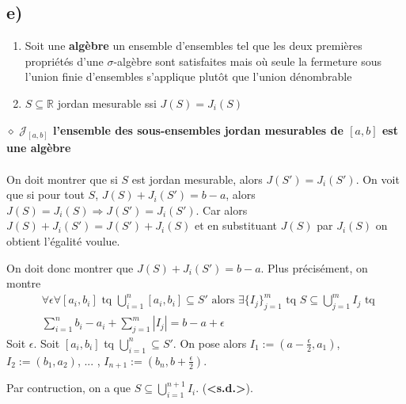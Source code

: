 \documentclass[a4paper,10pt]{article}
\begin{document}
\subsection*{e)}
\begin{enumerate}
	\item Soit une \textbf{algèbre} un ensemble d'ensembles tel que les deux premières propriétés d'une $\sigma$-algèbre sont satisfaites mais où seule la fermeture sous l'union finie d'ensembles s'applique plutôt que l'union dénombrable
	\item $S \subseteq \mathbb{R}$ jordan mesurable ssi $J(S) = J_i (S)$
\end{enumerate}
$\diamond$ \textbf{$\mathcal{J}_{[a,b]}$ l'ensemble des sous-ensembles jordan mesurables de $[a,b]$ est une algèbre}
\\
\\
On doit montrer que si $S$ est jordan mesurable, alors $J(S') = J_i (S')$. On voit que si pour tout $S$, $J(S) + J_i (S') = b-a$, alors $J(S) = J_i (S) \Rightarrow J(S') = J_i (S')$. Car alors $J(S) + J_i (S') = J(S') + J_i (S)$ et en substituant $J(S)$ par $J_i (S)$ on obtient l'égalité voulue.

On doit donc montrer que $J(S) + J_i (S') = b-a$. Plus précisément, on montre
\begin{align*}
	& \forall \epsilon \forall [a_i, b_i] \text{ tq } \bigcup_{i=1}^n [a_i, b_i] \subseteq S' \text{ alors } \exists \{I_j\}_{j=1}^m \text{ tq } S \subseteq \bigcup_{j=1}^m I_j \text{ tq } 
\\	
	& \sum_{i=1}^n b_i - a_i + \sum_{j=1}^m |I_j| = b - a + \epsilon
\end{align*}
Soit $\epsilon$. Soit $[a_i, b_i]$ tq $\bigcup_{i=1}^n \subseteq S'$. On pose alors $I_1 := (a - \frac{\epsilon}{2}, a_1)$, $I_2 := (b_1, a_2)$, ... , $I_{n+ 1} := (b_n, b + \frac{\epsilon}{2})$.

Par contruction, on a que $S \subseteq \bigcup_{i=1}^{n+1} I_i$. (\textbf{<s.d.>}).
\end{document}
